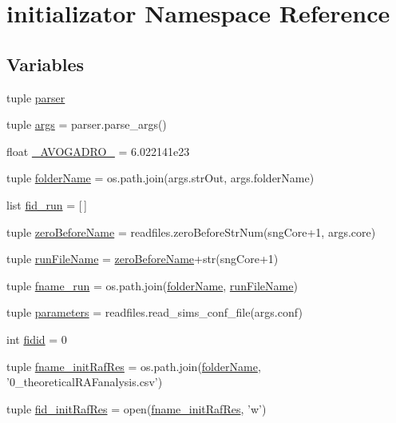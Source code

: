 \hypertarget{a00137}{\section{initializator Namespace Reference}
\label{a00137}
}
\subsection*{Variables}
\begin{DoxyCompactItemize}
\item 
tuple \hyperlink{a00137_af2659789ba1896029e3ab9bfbf83d019}{parser}
\item 
tuple \hyperlink{a00137_aedb2e5b77a354ccd69d9d38b3c30f61a}{args} = parser.\+parse\+\_\+args()
\item 
float \hyperlink{a00137_a01b3b6a0972397f230c35bd2fb8effc4}{\+\_\+\+A\+V\+O\+G\+A\+D\+R\+O\+\_\+} = 6.\+022141e23
\item 
tuple \hyperlink{a00137_aa51c106700ef9afbdb94a1c800e10569}{folder\+Name} = os.\+path.\+join(args.\+str\+Out, args.\+folder\+Name)
\item 
list \hyperlink{a00137_a6015a676cc06fdae98b1cca15d92b883}{fid\+\_\+run} = \mbox{[}$\,$\mbox{]}
\item 
tuple \hyperlink{a00137_a475e51ace78f2490aa4206915d0e3ae6}{zero\+Before\+Name} = readfiles.\+zero\+Before\+Str\+Num(sng\+Core+1, args.\+core)
\item 
tuple \hyperlink{a00137_a47868487619848c8ead2458c6855426a}{run\+File\+Name} = \hyperlink{a00137_a475e51ace78f2490aa4206915d0e3ae6}{zero\+Before\+Name}+str(sng\+Core+1)
\item 
tuple \hyperlink{a00137_a6bc5100ec1c6492cec974172df243857}{fname\+\_\+run} = os.\+path.\+join(\hyperlink{a00137_aa51c106700ef9afbdb94a1c800e10569}{folder\+Name}, \hyperlink{a00137_a47868487619848c8ead2458c6855426a}{run\+File\+Name})
\item 
tuple \hyperlink{a00137_a646de756d594b9a0eebf18c4eb9ee0d6}{parameters} = readfiles.\+read\+\_\+sims\+\_\+conf\+\_\+file(args.\+conf)
\item 
int \hyperlink{a00137_afdd976dc87dc056c8cba6926f9f98287}{fidid} = 0
\item 
tuple \hyperlink{a00137_a139a15a6b4127dd23049cb2b91a85d77}{fname\+\_\+init\+Raf\+Res} = os.\+path.\+join(\hyperlink{a00137_aa51c106700ef9afbdb94a1c800e10569}{folder\+Name}, '0\+\_\+theoretical\+R\+A\+Fanalysis.\+csv')
\item 
tuple \hyperlink{a00137_a2f15742bdb2c2cebe65c8e9730915e28}{fid\+\_\+init\+Raf\+Res} = open(\hyperlink{a00137_a139a15a6b4127dd23049cb2b91a85d77}{fname\+\_\+init\+Raf\+Res}, 'w')

\end{DoxyCompactItemize}
